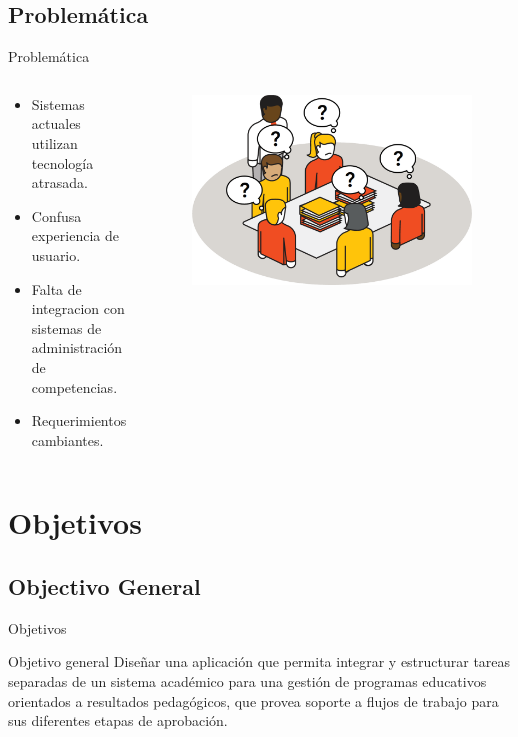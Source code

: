 \documentclass[10pt,xcolor=table ]{beamer}
\begin{document}
\subsection{Problemática}
\begin{frame}{Problemática}
	\begin{columns}[c,onlytextwidth]
		\begin{block}{}
			\begin{itemize}
	        	\item Sistemas actuales utilizan tecnología atrasada.
				\item Confusa experiencia de usuario.
				\item Falta de integracion con sistemas de administración de competencias.
				\item Requerimientos cambiantes.
	    	\end{itemize}
		\end{block}
		\begin{figure}[H]
			\includegraphics[scale=0.2]{../Figuras/unhappy_agile}
		\end{figure}
  	\end{columns}
\end{frame}

\section{Objetivos}
\subsection{Objectivo General}
\begin{frame}[t]{Objetivos}
	\begin{alertblock}{Objetivo general}
        Diseñar una aplicación que permita integrar y estructurar tareas separadas de un sistema académico para una gestión de programas educativos orientados a resultados pedagógicos, que provea soporte a flujos de trabajo para sus diferentes etapas de aprobación.
      \end{alertblock}
\end{frame}
\end{document}
